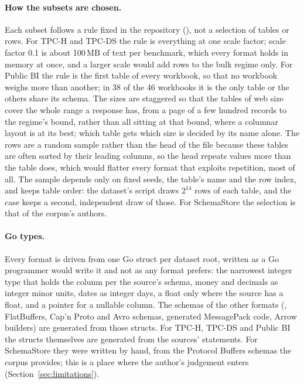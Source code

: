 \paragraph{How the subsets are chosen.} Each subset follows a rule fixed in
the repository (), not a selection of tables or rows.
For TPC-H and TPC-DS the rule is everything at one scale factor; scale factor
0.1 is about 100\,MB of text per benchmark, which every format holds in memory
at once, and a larger scale would add rows to the bulk regime only. For Public
BI the rule is the first table of every workbook, so that no workbook weighs
more than another; in 38 of the 46 workbooks it is the only table or the
others share its schema. The sizes are staggered so that the tables of web
size cover the whole range a response has, from a page of a few hundred
records to the regime's bound, rather than all sitting at that bound, where
a columnar layout is at its best; which table gets which size is decided by
its name alone. The rows are a random sample rather than the head of the file because
these tables are often sorted by their leading columns, so the head repeats
values more than the table does, which would flatter every format that
exploits repetition, \colbin{} most of all. The sample depends only on
fixed seeds, the table's name and the row index, and keeps table order: the
dataset's script draws $2^{14}$ rows of each table, and the case keeps a
second, independent draw of those. For
SchemaStore the selection is that of the corpus's authors.

\paragraph{Go types.} Every format is driven from one Go struct per dataset
root, written as a Go programmer would write it and not as any format
prefers: the narrowest integer type that holds the column per the source's
schema, money and decimals as integer minor units, dates as integer days, a
float only where the source has a float, and a pointer for a nullable column.
The schemas of the other formats (, FlatBuffers, Cap'n Proto and
Avro schemas, generated MessagePack code, Arrow builders) are generated from
those structs. For TPC-H, TPC-DS and Public BI the structs themselves are
generated from the sources'  statements. For SchemaStore
they were written by hand, from the Protocol Buffers schemas the corpus
provides; this is a place where the author's judgement enters
(Section~\ref{sec:limitations}).

